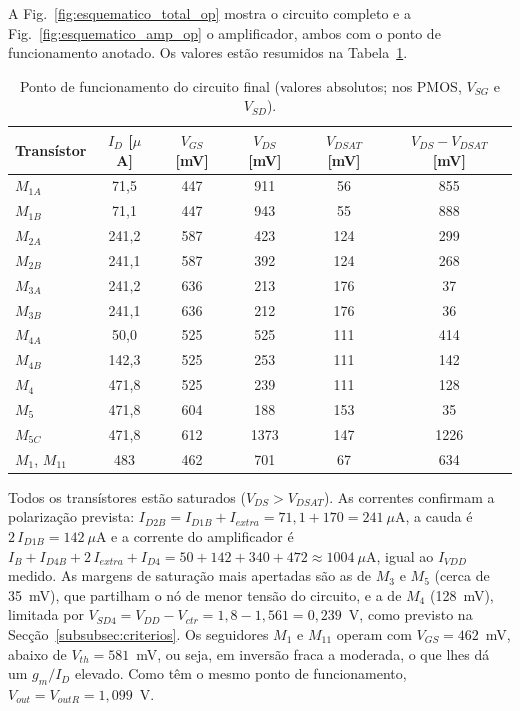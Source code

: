 A Fig.~\ref{fig:esquematico_total_op} mostra o circuito completo e a Fig.~\ref{fig:esquematico_amp_op} o amplificador,
ambos com o ponto de funcionamento anotado. Os valores estão resumidos na Tabela~\ref{tab:op_final}.


\begin{table}[H]
    \centering
    \caption{Ponto de funcionamento do circuito final (valores absolutos; nos PMOS, $V_{SG}$ e $V_{SD}$).}
    \label{tab:op_final}
    \begin{tabular}{lccccc}
        \toprule
        Transístor & $I_D$ [$\mu$A] & $V_{GS}$ [mV] & $V_{DS}$ [mV] & $V_{DSAT}$ [mV] & $V_{DS} - V_{DSAT}$ [mV] \\
        \midrule
        $M_{1A}$          & 71,5  & 447   & 911   & 56  & 855 \\
        $M_{1B}$          & 71,1  & 447   & 943   & 55  & 888 \\
        $M_{2A}$          & 241,2 & 587   & 423   & 124 & 299 \\
        $M_{2B}$          & 241,1 & 587   & 392   & 124 & 268 \\
        $M_{3A}$          & 241,2 & 636   & 213   & 176 & 37 \\
        $M_{3B}$          & 241,1 & 636   & 212   & 176 & 36 \\
        $M_{4A}$          & 50,0  & 525   & 525   & 111 & 414 \\
        $M_{4B}$          & 142,3 & 525   & 253   & 111 & 142 \\
        $M_4$             & 471,8 & 525   & 239   & 111 & 128 \\
        $M_5$             & 471,8 & 604   & 188   & 153 & 35 \\
        $M_{5C}$          & 471,8 & 612   & 1373  & 147 & 1226 \\
        $M_1$, $M_{11}$   & 483   & 462   & 701   & 67  & 634 \\
        \bottomrule
    \end{tabular}
\end{table}

Todos os transístores estão saturados ($V_{DS} > V_{DSAT}$). As correntes confirmam a polarização prevista:
$I_{D2B} = I_{D1B} + I_{extra} = 71{,}1 + 170 = 241~\mu$A, a cauda é $2\,I_{D1B} = 142~\mu$A e a corrente do amplificador
é $I_B + I_{D4B} + 2\,I_{extra} + I_{D4} = 50 + 142 + 340 + 472 \approx 1004~\mu$A, igual ao $I_{VDD}$ medido. As margens de
saturação mais apertadas são as de $M_3$ e $M_5$ (cerca de 35~mV), que partilham o nó de menor tensão do circuito, e a de
$M_4$ (128~mV), limitada por $V_{SD4} = V_{DD} - V_{ctr} = 1{,}8 - 1{,}561 = 0{,}239$~V, como previsto na
Secção~\ref{subsubsec:criterios}. Os seguidores $M_1$ e $M_{11}$ operam com $V_{GS} = 462$~mV, abaixo de
$V_{th} = 581$~mV, ou seja, em inversão fraca a moderada, o que lhes dá um $g_m/I_D$ elevado. Como têm o mesmo ponto de
funcionamento, $V_{out} = V_{outR} = 1{,}099$~V.

